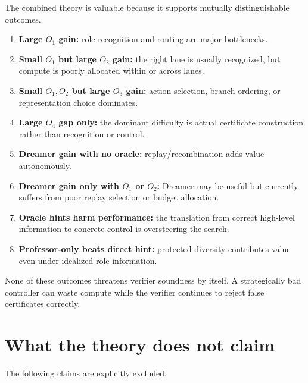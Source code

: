 The combined theory is valuable because it supports mutually distinguishable outcomes.

\begin{enumerate}[leftmargin=2em]
\item \textbf{Large $O_1$ gain:} role recognition and routing are major bottlenecks.
\item \textbf{Small $O_1$ but large $O_2$ gain:} the right lane is usually recognized, but compute is poorly allocated within or across lanes.
\item \textbf{Small $O_1,O_2$ but large $O_3$ gain:} action selection, branch ordering, or representation choice dominates.
\item \textbf{Large $O_4$ gap only:} the dominant difficulty is actual certificate construction rather than recognition or control.
\item \textbf{Dreamer gain with no oracle:} replay/recombination adds value autonomously.
\item \textbf{Dreamer gain only with $O_1$ or $O_2$:} Dreamer may be useful but currently suffers from poor replay selection or budget allocation.
\item \textbf{Oracle hints harm performance:} the translation from correct high-level information to concrete control is oversteering the search.
\item \textbf{Professor-only beats direct hint:} protected diversity contributes value even under idealized role information.
\end{enumerate}

None of these outcomes threatens verifier soundness by itself. A strategically bad controller can waste compute while the verifier continues to reject false certificates correctly.

\section{What the theory does not claim}

The following claims are explicitly excluded.


